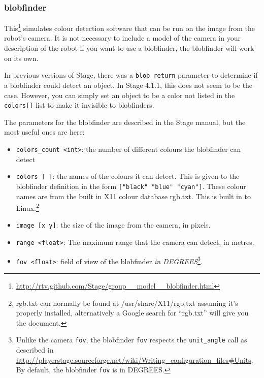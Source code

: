 \documentclass[a4paper]{report}
\begin{document}
\subsubsection{blobfinder}
This\footnote{\url{http://rtv.github.com/Stage/group__model__blobfinder.html}}
simulates colour detection software that can be run on the image from the
robot's camera. It is not necessary to include a model of the camera in
your description of the robot if you want to use a blobfinder, the
blobfinder will work on its own. 

In previous versions of Stage, there was a {\tt blob\_return}
parameter to determine if a blobfinder could detect an object.  In Stage
4.1.1, this does not seem to be the case.  However, you can simply set an
object to be a color not listed in the {\tt colors[]} list to make it invisible
to blobfinders.

The parameters for the blobfinder are described in the Stage manual, but
the most useful ones are here:
\begin{itemize}
      \item \verb|colors_count <int>|: the number of different colours the blobfinder can detect
      \item \verb|colors [ ]|: the names of the colours it can detect. This is given to the blobfinder definition in the form \verb|["black" "blue" "cyan"]|. 
      These colour names are from the built in X11 colour database rgb.txt. This is built in to Linux.\footnote{rgb.txt can normally be found at /usr/share/X11/rgb.txt assuming it's properly installed, alternatively a Google search for ``rgb.txt'' will give you the document.} 
      \item \verb|image [x y]|: the size of the image from the camera, in pixels.
      \item \verb|range <float>|: The maximum range that the camera can detect, in metres.
      \item \verb|fov <float>|: field of view of the blobfinder \emph{in DEGREES}\footnote{Unlike the camera {\tt fov}, the blobfinder {\tt fov} respects the {\tt unit\_angle} call as described in \url{http://playerstage.sourceforge.net/wiki/Writing\_configuration\_files\#Units}. By default, the blobfinder {\tt fov} is in DEGREES.}.
\end{itemize}
\end{document}

